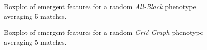 \documentclass{Configuration_Files/PoliMi3i_thesis}
\begin{document}
\vspace*{\fill}
{
\centering
\begin{figure}[hbt!]
    \centering
    \caption{Boxplot of emergent features for a random \textit{All-Black} phenotype averaging 5 matches.}
    \label{fig:emergent_features_noisiness_5_ab}
\end{figure}
}
\vspace*{\fill}
\begin{figure}[p]
    \caption{Boxplot of emergent features for a random \textit{Grid-Graph} phenotype averaging 5 matches.}
    \label{fig:emergent_features_noisiness_5_grid}
\end{figure}
\end{document}
